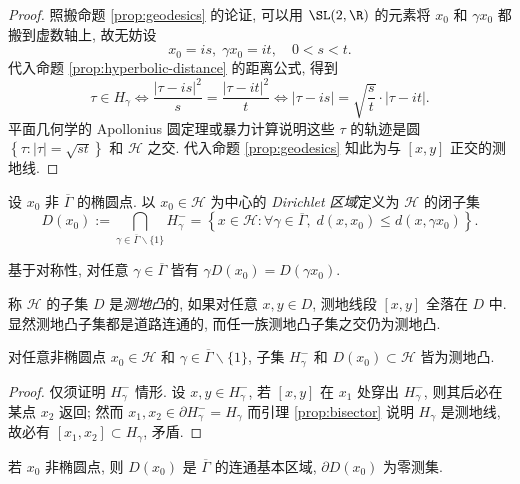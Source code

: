 \begin{proof}
	照搬命题 \ref{prop:geodesics} 的论证, 可以用 $\SL(2, \R)$ 的元素将 $x_0$ 和 $\gamma x_0$ 都搬到虚数轴上, 故无妨设
	\[ x_0 = is, \; \gamma x_0 = it, \quad 0 < s < t. \]
	代入命题 \ref{prop:hyperbolic-distance} 的距离公式, 得到
	\[ \tau \in H_\gamma \iff \frac{|\tau - is|^2}{s} = \frac{|\tau - it|^2}{t} \iff |\tau - is| = \sqrt{\frac{s}{t}} \cdot |\tau - it|. \]
	平面几何学的 Apollonius 圆定理或暴力计算说明这些 $\tau$ 的轨迹是圆 $\left\{ \tau: |\tau| = \sqrt{st} \right\}$ 和 $\mathcal{H}$ 之交. 代入命题 \ref{prop:geodesics} 知此为与 $[x,y]$ 正交的测地线.
\end{proof}

\begin{definition}  
	设 $x_0$ 非 $\overline{\Gamma}$ 的椭圆点. 以 $x_0 \in \mathcal{H}$ 为中心的 \emph{Dirichlet 区域}定义为 $\mathcal{H}$ 的闭子集
	\[ D(x_0) := \bigcap_{\gamma \in \overline{\Gamma} \smallsetminus \{1\}} H_\gamma^- = \left\{ x \in \mathcal{H}: \forall \gamma \in \overline{\Gamma},\; d(x, x_0) \leq d(x, \gamma x_0) \right\}. \] 
\end{definition}
基于对称性, 对任意 $\gamma \in \overline{\Gamma}$ 皆有 $\gamma D(x_0) = D(\gamma x_0)$.

称 $\mathcal{H}$ 的子集 $D$ 是\emph{测地凸}的, 如果对任意 $x,y \in D$, 测地线段 $[x,y]$ 全落在 $D$ 中. 显然测地凸子集都是道路连通的, 而任一族测地凸子集之交仍为测地凸.
\begin{proposition}
	对任意非椭圆点 $x_0 \in \mathcal{H}$ 和 $\gamma \in \overline{\Gamma} \smallsetminus \{1\}$, 子集 $H_\gamma^-$ 和 $D(x_0) \subset \mathcal{H}$ 皆为测地凸.
\end{proposition}
\begin{proof}
	仅须证明 $H_\gamma^-$ 情形. 设 $x, y \in H_\gamma^-$, 若 $[x,y]$ 在 $x_1$ 处穿出 $H_\gamma^-$, 则其后必在某点 $x_2$ 返回; 然而 $x_1, x_2 \in \partial H_\gamma^- = H_\gamma$ 而引理 \ref{prop:bisector} 说明 $H_\gamma$ 是测地线, 故必有 $[x_1, x_2] \subset H_\gamma$, 矛盾.
\end{proof}

\begin{proposition}\label{prop:Dirichlet-domain} 
	若 $x_0$ 非椭圆点, 则 $D(x_0)$ 是 $\overline{\Gamma}$ 的连通基本区域, $\partial D(x_0)$ 为零测集.
\end{proposition}

